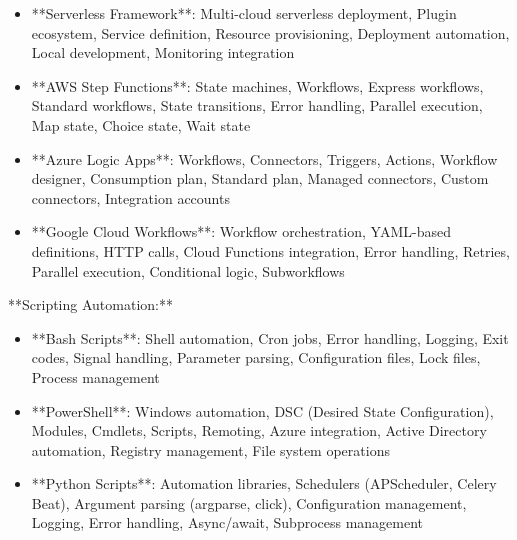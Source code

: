 \documentclass[11pt,a4paper]{article}
\begin{document}
\begin{itemize}
\item **Serverless Framework**: Multi-cloud serverless deployment, Plugin ecosystem, Service definition, Resource provisioning, Deployment automation, Local development, Monitoring integration
\end{itemize}

\begin{itemize}
\item **AWS Step Functions**: State machines, Workflows, Express workflows, Standard workflows, State transitions, Error handling, Parallel execution, Map state, Choice state, Wait state
\end{itemize}

\begin{itemize}
\item **Azure Logic Apps**: Workflows, Connectors, Triggers, Actions, Workflow designer, Consumption plan, Standard plan, Managed connectors, Custom connectors, Integration accounts
\end{itemize}

\begin{itemize}
\item **Google Cloud Workflows**: Workflow orchestration, YAML-based definitions, HTTP calls, Cloud Functions integration, Error handling, Retries, Parallel execution, Conditional logic, Subworkflows
\end{itemize}

**Scripting Automation:**

\begin{itemize}
\item **Bash Scripts**: Shell automation, Cron jobs, Error handling, Logging, Exit codes, Signal handling, Parameter parsing, Configuration files, Lock files, Process management
\end{itemize}

\begin{itemize}
\item **PowerShell**: Windows automation, DSC (Desired State Configuration), Modules, Cmdlets, Scripts, Remoting, Azure integration, Active Directory automation, Registry management, File system operations
\end{itemize}

\begin{itemize}
\item **Python Scripts**: Automation libraries, Schedulers (APScheduler, Celery Beat), Argument parsing (argparse, click), Configuration management, Logging, Error handling, Async/await, Subprocess management
\end{itemize}
\end{document}
